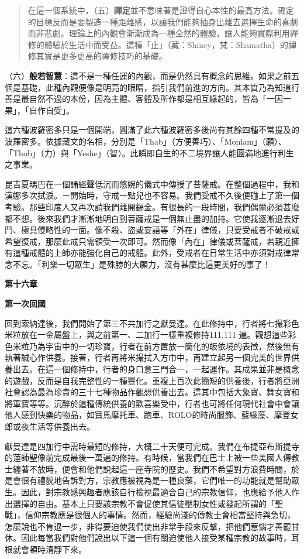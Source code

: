 \begin{quote}
在這一個系統中，（五）\textbf{禪定}並不意味著是證得自心本性的最高方法。禪定的目標反而是要製造一種距離感，以讓我們能夠抽身出離去選擇生命的喜劇而非悲劇。理論上的內觀會漸漸成為一種全然的體驗，讓人能夠實際利用禪修的體驗於生活中而受益。這種「止」（藏：Shiney，梵：Shamatha）的禪修其實是更多更高的禪修技巧的基礎。
\end{quote}

（六）\textbf{般若智慧}：這不是一種任運的內觀，而是仍然具有概念的思維。如果之前五個是基礎，此種內觀便像是明亮的眼睛，指引我們前進的方向。其本質乃為知道行善是最自然不過的本份，因為主體、客體及所作都是相互緣起的，皆為「一因一果」，「自作自受」。

這六種波羅密多只是一個開端，圓滿了此六種波羅密多後尚有其餘四種不常提及的波羅密多。依據藏文的名相，分別是「Thab」（方便善巧）、「Monlam」（願）、「Thob」（力）與「Yeshe」（智）。此瞬即自生的不二境界讓人能圓滿地進行利生之事業。

昆吉夏瑪巴在一個誦經聲低沉而悠婉的儀式中傳授了菩薩戒。在整個過程中，我和漢娜多次拭淚。ㄧ開始時，守戒一點兒也不容易。我們受戒不久後便碰上了第一個考驗。那些印度人又再次請我們離開錫金。有很長的一段時間，我們偶爾必須甚麼都不想。後來我們才漸漸地明白到菩薩戒是一個無止盡的加持。它使我逐漸退去好鬥、極具侵略性的一面。像不殺、盜或妄語等「外在」律儀，只要受戒者不破戒或希望復戒，那麼此戒只需領受一次即可。然而像「內在」律儀或菩薩戒，若親近擁有這種戒體的上師亦能強化自己的戒體。此外，受戒者在日常生活中亦須對戒律常念不忘。「利樂一切眾生」是殊勝的大願力，沒有甚麼比這更美好的事了！

\textbf{第十六章}

\textbf{第一次回國}

回到索納達後，我們開始了第三不共加行之獻曼達。在此修持中，行者將七撮彩色米粒放在一金屬盤上，與之前第一、二加行一樣重複修持111,111
遍。觀想這些彩色米粒乃為宇宙中的一切珍寶，行者在前方置放一簡化的皈依境的表徵，然後無有執著誠心作供養。接著，行者再將米撮拭入方巾中，再建立起另一個完美的世界供養出去。在這一個修持中，行者的身口意三門合一，一起運作。其成果並非是概念的遊戲，反而是自我完整性的一種豐化。重複上百次此簡短的供養後，行者將亞洲社會認為最為珍貴的三十七種物品作觀想供養出去。這其中包括大象寶、舞女寶和將軍寶等等。沉醉於這種傳統供養的歡喜樂受中，行者也可將任何現代社會中會讓他人感到快樂的物品，如寶馬摩托車、跑車、ROLO的時尚服飾、藍綠藻、摩登女郎或夜生活等供養出去。

獻曼達是四加行中需時最短的修持，大概二十天便可完成。我們在布提亞布斯提寺的蓮師聖像前完成最後一萬遍的修持。有時候，當我們在巴士上被一些美國人傳教士纏著不放時，便會和他們說起這一座寺院的歷史。我們不希望對方浪費時間，於是會很有禮貌地告訴對方，宗教應被視為是一種良藥，它們唯一的功能就是幫助眾生。因此，對宗教感興趣者應該自行檢視最適合自己的宗教信仰，也應給予他人作出選擇的自由。基本上只要該宗教不會促使其信徒壓制女性或發起所謂的「聖戰」，信仰宗教應是很個人的事情。然而，經驗尚淺的傳教士會相當堅持與急切，怎麼說也不肯退一步，非得要迫使我們使出非常手段來反擊，把他們惹惱才善罷甘休。因此每當我們對他們說出以下這一個有關迫使他人接受某種宗教的故事時，耳根就會頓時清靜下來。

